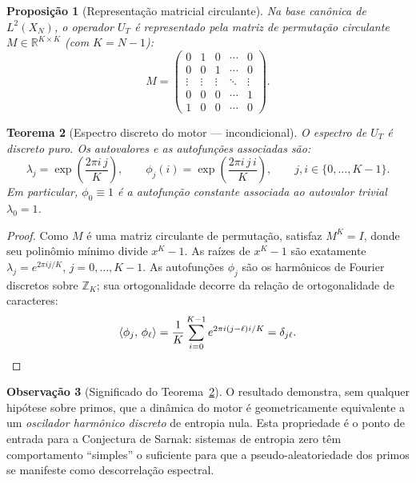 \documentclass[12pt,a4paper]{article}
\newtheorem{theorem}{Teorema}[section]
\newtheorem{proposition}[theorem]{Proposição}
\theoremstyle{definition}
\newtheorem{remark}[theorem]{Observação}
\newcommand{\Z}{\mathbb{Z}}
\newcommand{\R}{\mathbb{R}}
\newcommand{\ip}[2]{\langle #1,\, #2 \rangle}
\begin{document}
	\begin{proposition}[Representação matricial circulante]
		\label{prop:circulante}
		Na base canônica de $L^2(X_N)$, o operador $U_T$ é representado pela
		matriz de permutação circulante $M \in \R^{K\times K}$ (com $K = N-1$):
		\[
		M = \begin{pmatrix}
			0 & 1 & 0 & \cdots & 0 \\
			0 & 0 & 1 & \cdots & 0 \\
			\vdots & \vdots & \vdots & \ddots & \vdots \\
			0 & 0 & 0 & \cdots & 1 \\
			1 & 0 & 0 & \cdots & 0
		\end{pmatrix}.
		\]
	\end{proposition}
	
	\begin{theorem}[Espectro discreto do motor — incondicional]
		\label{thm:espectro}
		O espectro de $U_T$ é discreto puro. Os autovalores e as autofunções
		associadas são:
		\[
		\lambda_j = \exp\!\left(\frac{2\pi i\, j}{K}\right),\qquad
		\phi_j(i) = \exp\!\left(\frac{2\pi i\, j\, i}{K}\right),\qquad
		j,i \in \{0,\ldots,K-1\}.
		\]
		Em particular, $\phi_0 \equiv 1$ é a autofunção constante associada ao
		autovalor trivial $\lambda_0 = 1$.
	\end{theorem}
	
	\begin{proof}
		Como $M$ é uma matriz circulante de permutação, satisfaz $M^K = I$,
		donde seu polinômio mínimo divide $x^K - 1$. As raízes de $x^K - 1$
		são exatamente $\lambda_j = e^{2\pi ij/K}$, $j = 0,\ldots,K-1$. As
		autofunções $\phi_j$ são os harmônicos de Fourier discretos sobre
		$\Z_K$; sua ortogonalidade decorre da relação de ortogonalidade de
		caracteres:
		\[
		\ip{\phi_j}{\phi_\ell} = \frac{1}{K}\sum_{i=0}^{K-1}
		e^{2\pi i(j-\ell)i/K} = \delta_{j\ell}.\qedhere
		\]
	\end{proof}
	
	\begin{remark}[Significado do Teorema~\ref{thm:espectro}]
		O resultado demonstra, sem qualquer hipótese sobre primos, que a
		dinâmica do motor é geometricamente equivalente a um \emph{oscilador
			harmônico discreto} de entropia nula. Esta propriedade é o ponto de
		entrada para a Conjectura de Sarnak: sistemas de entropia zero têm
		comportamento ``simples'' o suficiente para que a pseudo-aleatoriedade
		dos primos se manifeste como descorrelação espectral.
	\end{remark}
	
\end{document}
